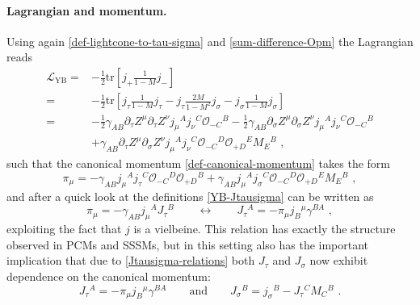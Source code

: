 \documentclass[12pt]{article}
\numberwithin{equation}{section}
\begin{document}
\paragraph{Lagrangian and momentum.} Using again \eqref{def-lightcone-to-tau-sigma} and \eqref{sum-difference-Opm} the Lagrangian reads
\begin{equation}\label{YB-Lagrangian}
\begin{aligned}
\mathcal{L}_{\text{YB}}=&-\tfrac{1}{2}\mathrm{tr}[j_{+}\frac{1}{1-M} j_{-}]
\\
=&-\tfrac{1}{2}\mathrm{tr}[j_{\tau}\frac{1}{1-M} j_{\tau}-j_{\tau}\frac{2M}{1-M^2} j_{\sigma}-j_{\sigma}\frac{1}{1-M} j_{\sigma}]
\\
=&-\tfrac{1}{2}\gamma_{AB}\partial_{\tau}Z^{\mu}\partial_{\tau}Z^{\nu}j_{\mu}{}^{A}j_{\nu}{}^{C}\mathcal{O}_{-C}{}^{B}-\tfrac{1}{2}\gamma_{AB}\partial_{\sigma}Z^{\mu}\partial_{\sigma}Z^{\nu}j_{\mu}{}^{A}j_{\nu}{}^{C}\mathcal{O}_{-C}{}^{B}
\\
&+\gamma_{AB}\partial_{\tau}Z^{\mu}\partial_{\sigma}Z^{\nu}j_{\mu}{}^{A}j_{\nu}{}^{C}\mathcal{O}_{-C}{}^{D}\mathcal{O}_{+D}{}^{E}M_{E}{}^{B} \,\, ,
\end{aligned} 
\end{equation}
such that the canonical momentum \eqref{def-canonical-momentum} takes the form
\begin{equation}
\pi_{\mu}=-\gamma_{AB}j_{\mu}{}^{A}j_{\tau}{}^{C}\mathcal{O}_{-C}{}^{D}\mathcal{O}_{+D}{}^{B}+\gamma_{AB}j_{\mu}{}^{A}j_{\sigma}{}^{C}\mathcal{O}_{-C}{}^{D}\mathcal{O}_{+D}{}^{E}M_{E}{^{B}} \,\, ,
\end{equation}
and after a quick look at the definitions \eqref{YB-Jtausigma} can be written as
\begin{equation}\label{YB-pi-J-relation}
\pi_{\mu}=-\gamma_{AB}j_{\mu}{}^{A}J_{\tau}{}^{B}
\qquad \longleftrightarrow \qquad
J_{\tau}{}^{A}=-\pi_{\mu}j_{B}{}^{\mu}\gamma^{BA} \,\, ,
\end{equation}
exploiting the fact that $j$ is a vielbeine. This relation has exactly the structure observed in PCMs and SSSMs, but in this setting also has the important implication that due to \eqref{Jtausigma-relations} both $J_{\tau}$ and $J_{\sigma}$ now exhibit dependence on the canonical momentum:
\begin{equation}\label{Jtau-and-Jsigma-functions-of-momentum}
J_{\tau}{}^{A}=-\pi_{\mu}j_{B}{}^{\mu}\gamma^{BA} 
\qquad \text{and} \qquad 
J_{\sigma}{}^{B}=j_{\sigma}{}^{B}-J_{\tau}{}^{C}M_{C}{^{B}} \,\, .
\end{equation}
\end{document}

